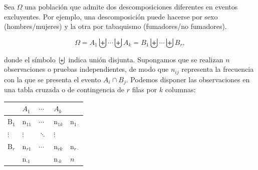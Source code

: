 \documentclass[
]{article}
\begin{document}
Sea \(\Omega\) una población que admite dos descomposiciones diferentes en eventos excluyentes. Por ejemplo, una descomposición puede hacerse por sexo (hombres/mujeres) y la otra por tabaquismo (fumadores/no fumadores).

\[
\Omega=A_{1} \biguplus \cdots \biguplus A_{k}=B_{1} \biguplus \cdots \biguplus B_{r},
\]

donde el símbolo \(\biguplus\) indica unión disjunta. Supongamos que se realizan \(n\) observaciones o pruebas independientes, de modo que \(n_{ij}\) representa la frecuencia con la que se presenta el evento \(A_i \cap B_j\). Podemos disponer las observaciones en una tabla cruzada o de contingencia de \(r\) filas por \(k\) columnas:

\begin{longtable}[]{@{}
  >{\raggedright\arraybackslash}p{}
  >{\raggedright\arraybackslash}p{}
  >{\raggedright\arraybackslash}p{}
  >{\raggedright\arraybackslash}p{}
  >{\raggedright\arraybackslash}p{}@{}}
\toprule\noalign{}
\begin{minipage}[b]{\linewidth}\raggedright
\end{minipage} & \begin{minipage}[b]{\linewidth}\raggedright
\(A_{1}\)
\end{minipage} & \begin{minipage}[b]{\linewidth}\raggedright
\(\cdots\)
\end{minipage} & \begin{minipage}[b]{\linewidth}\raggedright
\(A_{k}\)
\end{minipage} & \begin{minipage}[b]{\linewidth}\raggedright
\end{minipage} \\
\midrule\noalign{}
\endhead
\bottomrule\noalign{}
\endlastfoot
\(\mathrm{B}_{1}\) & \(\mathrm{n}_{11}\) & \(\cdots\) & \(\mathrm{n}_{1k}\) & \(\mathrm{n}_{1\cdot}\) \\
\(\vdots\) & \(\vdots\) & \(\ddots\) & \(\vdots\) & \\
\(\mathrm{B}_{r}\) & \(\mathrm{n}_{r1}\) & \(\cdots\) & \(\mathrm{n}_{rk}\) & \(\mathrm{n}_{r\cdot}\) \\
& \(\mathrm{n}_{\cdot 1}\) & & \(\mathrm{n}_{\cdot k}\) & \(n\) \\
\end{longtable}
\end{document}
